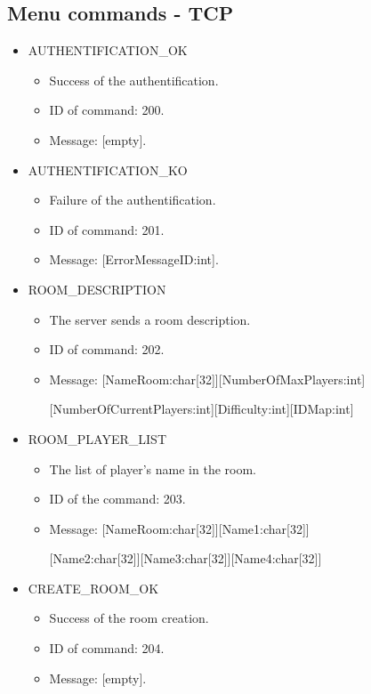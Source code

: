 \documentclass[a4 paper, 12pt]{report}
\begin{document}
\subsection{Menu commands - TCP}

\begin{itemize}
\item AUTHENTIFICATION\_OK
  \begin{itemize}
  \item Success of the authentification.
  \item ID of command: 200.
  \item Message: [empty].
  \end{itemize}

\item AUTHENTIFICATION\_KO
  \begin{itemize}
  \item Failure of the authentification.
  \item ID of command: 201.
  \item Message: [ErrorMessageID:int].
  \end{itemize}

\item ROOM\_DESCRIPTION
  \begin{itemize}
  \item The server sends a room description.
  \item ID of command: 202.
  \item Message: [NameRoom:char[32]][NumberOfMaxPlayers:int]
  \item[] [NumberOfCurrentPlayers:int][Difficulty:int][IDMap:int]
  \end{itemize}

\item ROOM\_PLAYER\_LIST
  \begin{itemize}
  \item The list of player's name in the room.
  \item ID of the command: 203.
  \item Message: [NameRoom:char[32]][Name1:char[32]]
  \item[] [Name2:char[32]][Name3:char[32]][Name4:char[32]]
  \end{itemize}

\item CREATE\_ROOM\_OK
  \begin{itemize}
  \item Success of the room creation.
  \item ID of command: 204.
  \item Message: [empty].
  \end{itemize}


\end{itemize}
\end{document}
